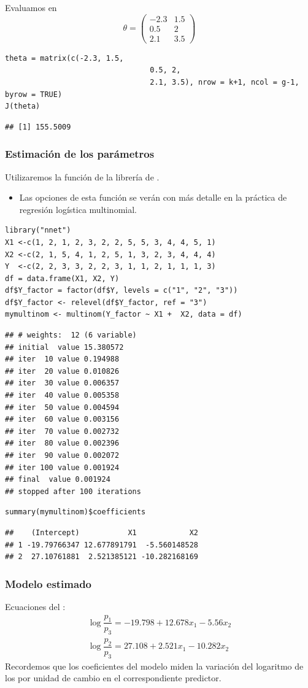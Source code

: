Evaluamos en \[ \theta=\begin{pmatrix}
	-2.3 & 1.5\\
	0.5 & 2\\
	2.1 & 3.5
\end{pmatrix} \]
\begin{lstlisting}
theta = matrix(c(-2.3, 1.5,
								 0.5, 2,
								 2.1, 3.5), nrow = k+1, ncol = g-1, byrow = TRUE)
J(theta)
\end{lstlisting}
\begin{verbatim}
## [1] 155.5009
\end{verbatim}
\subsubsection{Estimación de los parámetros}
Utilizaremos la función  de la librería  de .
\begin{itemize}
	\item Las opciones de esta función se verán con más detalle en la práctica de regresión logística multinomial.
\end{itemize}
\begin{lstlisting}
library("nnet")
X1 <-c(1, 2, 1, 2, 3, 2, 2, 5, 5, 3, 4, 4, 5, 1)
X2 <-c(2, 1, 5, 4, 1, 2, 5, 1, 3, 2, 3, 4, 4, 4)
Y  <-c(2, 2, 3, 3, 2, 2, 3, 1, 1, 2, 1, 1, 1, 3)
df = data.frame(X1, X2, Y)
df$Y_factor = factor(df$Y, levels = c("1", "2", "3"))
df$Y_factor <- relevel(df$Y_factor, ref = "3")
mymultinom <- multinom(Y_factor ~ X1 +  X2, data = df)
\end{lstlisting}
\begin{verbatim}
## # weights:  12 (6 variable)
## initial  value 15.380572 
## iter  10 value 0.194988
## iter  20 value 0.010826
## iter  30 value 0.006357
## iter  40 value 0.005358
## iter  50 value 0.004594
## iter  60 value 0.003156
## iter  70 value 0.002732
## iter  80 value 0.002396
## iter  90 value 0.002072
## iter 100 value 0.001924
## final  value 0.001924 
## stopped after 100 iterations
\end{verbatim}
\begin{lstlisting}
summary(mymultinom)$coefficients
\end{lstlisting}
\begin{verbatim}
##    (Intercept)           X1            X2
## 1 -19.79766347 12.677891791  -5.560148528
## 2  27.10761881  2.521385121 -10.282168169
\end{verbatim}
\subsubsection{Modelo estimado}
Ecuaciones del :
\[ \begin{array}{l}
	\log\dfrac{p_1}{p_3}=-19.798+12.678x_1-5.56x_2\\
	\log\dfrac{p_2}{p_3}=27.108+2.521x_1-10.282x_2
\end{array} \]
Recordemos que los coeficientes del modelo miden la variación del logaritmo de los  por unidad de cambio en el correspondiente predictor.

